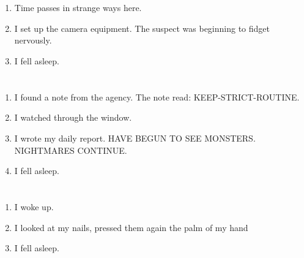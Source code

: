 \documentclass{article}
\begin{document}
    \section{}
    
    \begin{enumerate}
    
    \item Time passes in strange ways here.\\
    
    \item I set up the camera equipment. The suspect was beginning to fidget nervously.\\
    
    \item I fell asleep.\\
    
    \end{enumerate}
     
    \newpage
    
    \section{}
    
    \begin{enumerate}
    
    \item I found a note from the agency. The note read: KEEP-STRICT-ROUTINE.\\
    
    \item I watched through the window.\\
    
    \item I wrote my daily report. HAVE BEGUN TO SEE MONSTERS. NIGHTMARES CONTINUE.\\
    
    \item I fell asleep.\\
    
    \end{enumerate}
     
    \newpage
    
    \section{}
    
    \begin{enumerate}
    
    \item I woke up.\\
    
    \item I looked at my nails, pressed them again the palm of my hand\\
    
    \item I fell asleep.\\
    
    \end{enumerate}
     
\end{document}
